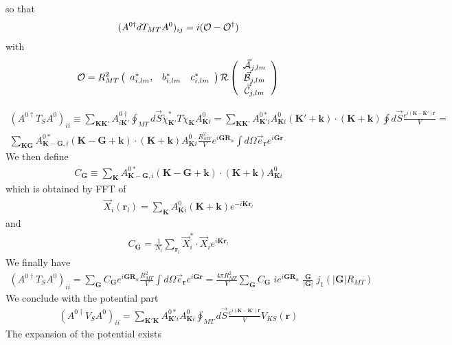 \documentclass[aps,prb,floatfix,epsfig,singlecolumn,showpacs,preprintnumbers]{revtex4}
\newcommand{\vR}{{\mathbf{R}}}
\renewcommand{\vr}{{\mathbf{r}}}
\newcommand{\vk}{{\mathbf{k}}}
\newcommand{\vK}{{\mathbf{K}}}
\newcommand{\vG}{{\mathbf{G}}}
\newcommand{\cR}{{\cal R}}
\newcommand{\cO}{{\cal O}}
\newcommand{\vcA}{\vec{\cal A}}
\newcommand{\vcB}{\vec{\cal B}}
\newcommand{\vcC}{\vec{\cal C}}
\begin{document}
so that
\begin{eqnarray}
(A^{0\dagger} dT_{MT} A^0)_{ij} = i (\cO-\cO^\dagger)
\end{eqnarray}
with
\begin{eqnarray}
\cO = R_{MT}^2 
\left(
\begin{array}{ccc}
a_{i,lm}^*, & b_{i,lm}^* & c^*_{i,lm}
\end{array}
\right)
\cR
\left(
\begin{array}{c}
\vcA_{j,lm}\\
\vcB_{j,lm}\\ 
\vcC_{j,lm}
\end{array}
\right)
\end{eqnarray}


\begin{eqnarray}
(A^{0\dagger} T_S A^0)_{ii} \equiv \sum_{\vK\vK'}A^{0\dagger}_{i\vK'}\oint_{MT} d\vec{S} \tilde{\chi}_{\vK'}^* T  \tilde{\chi}_{\vK}A^0_{\vK i}=
\sum_{\vK\vK'}A^{0*}_{\vK' i} A^0_{\vK i}(\vK'+\vk)\cdot(\vK+\vk)\oint  d\vec{S}\frac{e^{i(\vK-\vK')\vr}}{V}=
\\
\sum_{\vK\vG}A^{0*}_{\vK-\vG, i} (\vK-\vG+\vk)\cdot(\vK+\vk) A^0_{\vK  i} 
\frac{R_{MT}^2}{V} e^{i\vG\vR_\alpha}\int d\Omega\vec{e}_\vr  {e^{i\vG\vr}}
\end{eqnarray}
We then define
\begin{eqnarray}
C_\vG\equiv \sum_{\vK}A^{0*}_{\vK-\vG, i} (\vK-\vG+\vk)\cdot(\vK+\vk) A^0_{\vK  i} 
\end{eqnarray}
which is obtained by FFT of 
\begin{eqnarray}
\vec{X}_i(\vr_l)= \sum_\vK A^0_{\vK  i} (\vK+\vk) e^{-i\vK\vr_l}
\end{eqnarray}
and
\begin{eqnarray}
C_\vG = \frac{1}{N_l}\sum_{\vr_l}\vec{X}^*_i\cdot\vec{X}_i e^{i\vK\vr_l}
\end{eqnarray}
We finally have
\begin{eqnarray}
(A^{0\dagger} T_S A^0)_{ii} =
\sum_{\vG} C_\vG e^{i\vG\vR_\alpha}\frac{R_{MT}^2}{V} \int d\Omega\vec{e}_\vr  {e^{i\vG\vr}}=
\frac{4\pi R_{MT}^2}{V} \sum_{\vG}C_\vG\; i e^{i\vG\vR_\alpha}\;
\frac{\vG}{|\vG|} \; j_1(|\vG|R_{MT})
\end{eqnarray}
We conclude with the potential part
\begin{eqnarray}
(A^{0\dagger} V_S A^0)_{ii} =
\sum_{\vK'\vK} A^{0*}_{\vK' i} A^0_{\vK i} \oint_{MT} d\vec{S}  \frac{e^{i(\vK-\vK')\vr}}{V} V_{KS}(\vr)
\end{eqnarray}
The expansion of the potential exists
\end{document}
